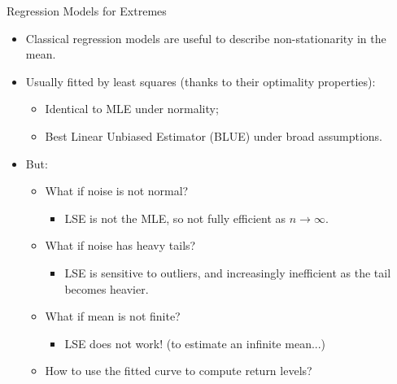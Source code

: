 \documentclass[10pt, hyperref={colorlinks = true,linkcolor = blue}]{beamer}
\begin{document}
{{{\begin{frame}{Regression Models for Extremes}
\begin{itemize}
    \item Classical regression models are useful to describe non-stationarity in the mean.
    \item Usually fitted by least squares (thanks to their optimality properties):
    \begin{itemize}
        \item Identical to MLE under normality;
        \item Best Linear Unbiased Estimator (BLUE) under broad assumptions.
    \end{itemize}
    \item But:
    \begin{itemize}
        \item What if noise is not normal?
        \begin{itemize}
            \item LSE is not the MLE, so not fully efficient as \(n \to \infty\).
        \end{itemize}
        \item What if noise has heavy tails?
        \begin{itemize}
            \item LSE is sensitive to outliers, and increasingly inefficient as the tail becomes heavier.
        \end{itemize}
        \item What if mean is not finite?
        \begin{itemize}
            \item LSE does not work! (to estimate an infinite mean...)
        \end{itemize}
        \item How to use the fitted curve to compute return levels?
    \end{itemize}
\end{itemize}

\end{frame}



}}}
\end{document}
